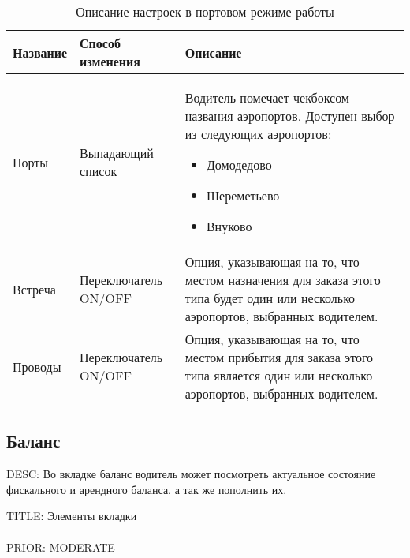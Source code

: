       \begin{table}
          \begin{center}
          \label{driver_app_robot_tab_table_port_mode}
          \caption {Описание настроек в портовом режиме работы}
          \setlength{\extrarowheight}{2mm}
          \begin{tabular}{|p{4cm}|p{3cm}|p{8cm}|}

            \hline     \textbf{Название}&\textbf{Способ изменения}&\textbf{Описание} \\ [2mm]

            \hline   Порты & Выпадающий список & Водитель помечает чекбоксом названия аэропортов. Доступен выбор из следующих аэропортов: \begin{itemize} \item Домодедово \item Шереметьево \item Внуково \end{itemize} \\ [2mm]

            \hline   Встреча & Переключатель ON/OFF & Опция, указывающая на то, что местом назначения для заказа этого типа будет один или несколько аэропортов, выбранных водителем. \\ [2mm]

            \hline   Проводы & Переключатель ON/OFF & Опция, указывающая на то, что местом прибытия для заказа этого типа является один или несколько аэропортов, выбранных водителем. \\ [2mm]

            \hline
          \end{tabular}
          \end{center}
      \end{table}

  \subsection{Баланс}

    DESC: Во вкладке баланс водитель может посмотреть актуальное состояние фискального и арендного баланса, а так же пополнить их. 

      TITLE: Элементы вкладки\\
      \\
      PRIOR: MODERATE\\

